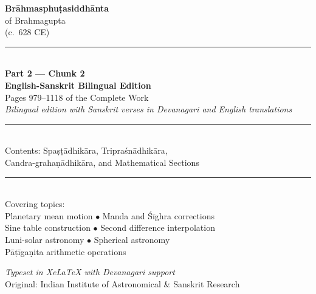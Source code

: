 \documentclass[11pt,a4paper]{article}
\newcommand{\shortline}{\noindent\rule{0.5\textwidth}{0.4pt}\par}
\begin{document}
\begin{titlepage}
\begin{center}
\vspace*{2.5cm}

{\Huge\bfseries\color{titlecolor} Br\=ahmasphu\d{t}asiddh\=anta}\\[0.6cm]
{\LARGE\color{sectioncolor} of Brahmagupta}\\[0.3cm]
{\large (c.\ 628 CE)}\\[1.5cm]

\shortline\\[0.5cm]
{\Large\bfseries Part 2 --- Chunk 2}\\[0.3cm]
{\large \textbf{English-Sanskrit Bilingual Edition}}\\[0.3cm]
{\normalsize Pages 979--1118 of the Complete Work}\\[0.5cm]
{\small \textit{Bilingual edition with Sanskrit verses in Devanagari and English translations}}\\[1cm]
\shortline\\[1.5cm]

{\large Contents: Spa\d{s}\d{t}\=adhik\=ara, Tripra\'sn\=adhik\=ara,}\\[0.2cm]
{\large Candra-graha\d{n}\=adhik\=ara, and Mathematical Sections}\\[2cm]

\shortline\\[0.8cm]
{\normalsize Covering topics:}\\[0.3cm]
{\small Planetary mean motion $\bullet$ Manda and \'S\=ighra corrections}\\[0.2cm]
{\small Sine table construction $\bullet$ Second difference interpolation}\\[0.2cm]
{\small Luni-solar astronomy $\bullet$ Spherical astronomy}\\[0.2cm]
{\small P\=a\d{t}\=iga\d{n}ita arithmetic operations}\\[1.5cm]

\vfill

{\small\textit{Typeset in XeLaTeX with Devanagari support}}\\[0.3cm]
{\small Original: Indian Institute of Astronomical \& Sanskrit Research}

\end{center}
\end{titlepage}
\end{document}
